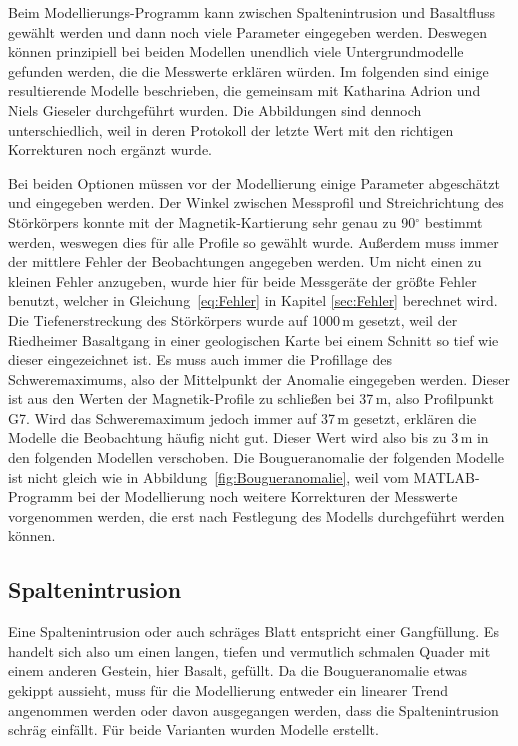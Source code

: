Beim Modellierungs-Programm kann zwischen Spaltenintrusion und Basaltfluss gewählt werden und dann noch viele Parameter eingegeben werden. Deswegen können prinzipiell bei beiden Modellen unendlich viele Untergrundmodelle gefunden werden, die die Messwerte erklären würden. Im folgenden sind einige resultierende Modelle beschrieben, die gemeinsam mit Katharina Adrion und Niels Gieseler durchgeführt wurden. Die Abbildungen sind dennoch unterschiedlich, weil in deren Protokoll der letzte Wert mit den richtigen Korrekturen noch ergänzt wurde.

Bei beiden Optionen müssen vor der Modellierung einige Parameter abgeschätzt und eingegeben werden. Der Winkel zwischen Messprofil und Streichrichtung des Störkörpers konnte mit der Magnetik-Kartierung sehr genau zu 90$^\circ$ bestimmt werden, weswegen dies für alle Profile so gewählt wurde. Außerdem muss immer der mittlere Fehler der Beobachtungen angegeben werden. Um nicht einen zu kleinen Fehler anzugeben, wurde hier für beide Messgeräte der größte Fehler benutzt, welcher in Gleichung~\eqref{eq:Fehler} in Kapitel \ref{sec:Fehler} berechnet wird. Die Tiefenerstreckung des Störkörpers wurde auf 1000\,m gesetzt, weil der Riedheimer Basaltgang in einer geologischen Karte bei einem Schnitt so tief wie dieser eingezeichnet ist. Es muss auch immer die Profillage des Schweremaximums, also der Mittelpunkt der Anomalie eingegeben werden. Dieser ist aus den Werten der Magnetik-Profile zu schließen bei 37\,m, also Profilpunkt G7. 
Wird das Schweremaximum jedoch immer auf 37\,m gesetzt, erklären die Modelle die Beobachtung häufig nicht gut. Dieser Wert wird also bis zu 3\,m in den folgenden Modellen verschoben.
Die Bougueranomalie der folgenden Modelle ist nicht gleich wie in Abbildung~\ref{fig:Bougueranomalie}, weil vom MATLAB-Programm bei der Modellierung noch weitere Korrekturen der Messwerte vorgenommen werden, die erst nach Festlegung des Modells durchgeführt werden können.

\subsection{Spaltenintrusion}

Eine Spaltenintrusion oder auch schräges Blatt entspricht einer Gangfüllung. Es handelt sich also um einen langen, tiefen und vermutlich schmalen Quader mit einem anderen Gestein, hier Basalt, gefüllt.
Da die Bougueranomalie etwas gekippt aussieht, muss für die Modellierung entweder ein linearer Trend angenommen werden oder davon ausgegangen werden, dass die Spaltenintrusion schräg einfällt. Für beide Varianten wurden Modelle erstellt.

